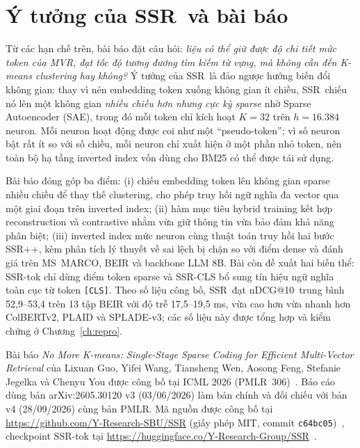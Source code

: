 \documentclass[a4paper,13pt]{extreport}
\makeatletter
\theoremstyle{plain}
\newcommand{\ssr}{SSR}
\newcommand{\ssrpp}{SSR++}
\newcommand{\ndcg}{nDCG@10}
\makeatother
\begin{document}
\section{Ý tưởng của \ssr\ và bài báo}
\label{sec:ssr-idea}
Từ các hạn chế trên, bài báo đặt câu hỏi: \emph{liệu có thể giữ được độ chi tiết mức token của MVR, đạt tốc độ tương đương tìm kiếm từ vựng, mà không cần đến K-means clustering hay không?} Ý tưởng của \ssr\ là đảo ngược hướng biến đổi không gian: thay vì nén embedding token xuống không gian ít chiều, \ssr\ chiếu nó lên một không gian \emph{nhiều chiều hơn nhưng cực kỳ sparse} nhờ Sparse Autoencoder (SAE), trong đó mỗi token chỉ kích hoạt $K=32$ trên $h=16.384$ neuron. Mỗi neuron hoạt động được coi như một ``pseudo-token''; vì số neuron bật rất ít so với số chiều, mỗi neuron chỉ xuất hiện ở một phần nhỏ token, nên toàn bộ hạ tầng inverted index vốn dùng cho BM25 có thể được tái sử dụng.

Bài báo đóng góp ba điểm: (i) chiếu embedding token lên không gian sparse nhiều chiều để thay thế clustering, cho phép truy hồi ngữ nghĩa đa vector qua một giai đoạn trên inverted index; (ii) hàm mục tiêu hybrid training kết hợp reconstruction và contrastive nhằm vừa giữ thông tin vừa bảo đảm khả năng phân biệt; (iii) inverted index mức neuron cùng thuật toán truy hồi hai bước \ssrpp, kèm phân tích lý thuyết về sai lệch bị chặn so với điểm dense và đánh giá trên MS~MARCO, BEIR và backbone LLM 8B. Bài còn đề xuất hai biến thể: \ssr-tok chỉ dùng điểm token sparse và \ssr-CLS bổ sung tín hiệu ngữ nghĩa toàn cục từ token \texttt{[CLS]}. Theo số liệu công bố, \ssr\ đạt \ndcg\ trung bình 52,9--53,4 trên 13 tập BEIR với độ trễ 17,5--19,5 ms, vừa cao hơn vừa nhanh hơn ColBERTv2, PLAID và SPLADE-v3; các số liệu này được tổng hợp và kiểm chứng ở Chương~\ref{ch:repro}.

Bài báo \emph{No More K-means: Single-Stage Sparse Coding for Efficient Multi-Vector Retrieval} của Lixuan Guo, Yifei Wang, Tiansheng Wen, Aosong Feng, Stefanie Jegelka và Chenyu You được công bố tại ICML 2026 (PMLR~306)~\cite{ssr}. Báo cáo dùng bản arXiv:2605.30120 v3 (03/06/2026) làm bản chính và đối chiếu với bản v4 (28/09/2026) cùng bản PMLR. Mã nguồn được công bố tại \url{https://github.com/Y-Research-SBU/SSR} (giấy phép MIT, commit \texttt{c64bc05})~\cite{ssrcode}, checkpoint \ssr-tok tại \url{https://huggingface.co/Y-Research-Group/SSR}~\cite{ssrckpt}.
\end{document}
